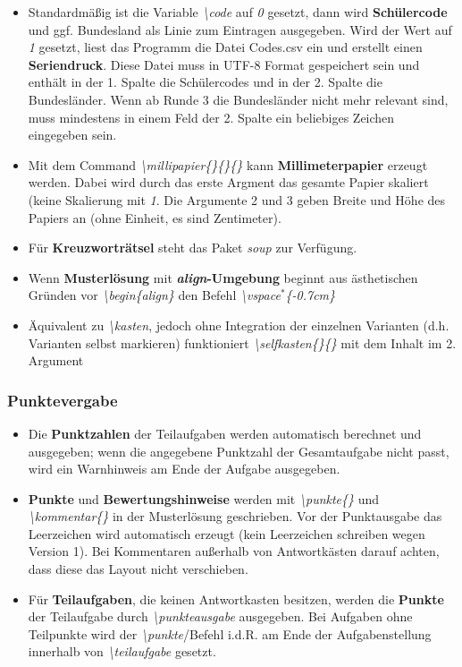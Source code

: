 \documentclass[./main.tex]{subfiles}
\begin{document}
\begin{itemize}
    \item Standardm\"a\ss{}ig ist die Variable \hypertarget{code}{\textit{\textbackslash code}} auf \textit{0} gesetzt, dann wird \textbf{Sch\"ulercode} und ggf. Bundesland als Linie zum Eintragen ausgegeben. Wird der Wert auf \textit{1} gesetzt, liest das Programm die Datei Codes.csv ein und erstellt einen \textbf{Seriendruck}. Diese Datei muss in UTF-8 Format gespeichert sein und enth\"alt in der 1. Spalte die Sch\"ulercodes und in der 2. Spalte die Bundesl\"ander. Wenn ab Runde 3 die Bundesl\"ander nicht mehr relevant sind, muss mindestens in einem Feld der 2. Spalte ein beliebiges Zeichen eingegeben sein.
    \item \hypertarget{millipapier}{} Mit dem Command \textit{\textbackslash millipapier\{\}\{\}\{\}} kann \textbf{Millimeterpapier} erzeugt werden. Dabei wird durch das erste Argment das gesamte Papier skaliert (keine Skalierung mit \textit{1}. Die Argumente 2 und 3 geben Breite und H\"ohe des Papiers an (ohne Einheit, es sind Zentimeter).
    \item F\"ur \textbf{Kreuzwortr\"atsel} steht das Paket \textit{soup} zur Verf\"ugung.
    \item \hypertarget{vspace}{} Wenn \textbf{Musterl\"osung} mit \textbf{\textit{align}-Umgebung} beginnt aus \"asthetischen Gr\"unden vor \textit{\textbackslash begin\{align\}} den Befehl \textit{\textbackslash vspace$^*$\{-0.7cm\}}
    \item \"Aquivalent zu \textit{\textbackslash kasten}, jedoch ohne Integration der einzelnen Varianten (d.h. Varianten selbst markieren) funktioniert \textit{\hypertarget{selfkasten}{\textbackslash selfkasten\{\}\{\}}} mit dem Inhalt im 2. Argument
\end{itemize}

\subsubsection{Punktevergabe}
\begin{itemize}
    \item Die \textbf{Punktzahlen} der Teilaufgaben werden automatisch berechnet und ausgegeben; wenn die angegebene Punktzahl der Gesamtaufgabe nicht passt, wird ein Warnhinweis am Ende der Aufgabe ausgegeben.
    \item \textbf{Punkte} und \textbf{Bewertungshinweise} werden mit \hypertarget{punkte}{\textit{\textbackslash punkte\{\}}} und \hypertarget{kommentar}{\textit{\textbackslash kommentar\{\}}} in der Musterl\"osung geschrieben. Vor der Punktausgabe das Leerzeichen wird automatisch erzeugt (kein Leerzeichen schreiben wegen Version 1). Bei Kommentaren au\ss{}erhalb von Antwortk\"asten darauf achten, dass diese das Layout nicht verschieben.
    \item F\"ur \textbf{Teilaufgaben}, die keinen Antwortkasten besitzen, werden die \textbf{Punkte} der Teilaufgabe durch \hypertarget{punkteausgabe}{\textit{\textbackslash punkteausgabe}} ausgegeben. Bei Aufgaben ohne Teilpunkte wird der \textit{\textbackslash punkte}\-/Befehl i.d.R. am Ende der Aufgabenstellung innerhalb von \textit{\textbackslash teilaufgabe} gesetzt.
\end{itemize}
\end{document}
